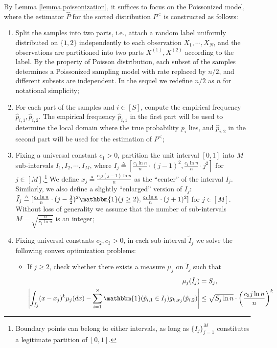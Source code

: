 \documentclass[final,12pt]{colt2018} %
\begin{document}
By Lemma \ref{lemma.poissonization}, it suffices to focus on the Poissonized model, where the estimator $\hat{P}$ for the sorted distribution $P^<$ is constructed as follows:
\begin{enumerate}
	\item Split the samples into two parts, i.e., attach a random label uniformly distributed on $\{1,2\}$ independently to each observation $X_1,\cdots,X_N$, and the observations are partitioned into two parts $X^{(1)}, X^{(2)}$ according to the label. By the property of Poisson distribution, each subset of the samples determines a Poissonized sampling model with rate replaced by $n/2$, and different subsets are independent. In the sequel we redefine $n/2$ as $n$ for notational simplicity;
	\item For each part of the samples and $i\in [S]$, conpute the empirical frequency $\hat{p}_{i,1}, \hat{p}_{i,2}$. The empirical frequency $\hat{p}_{i,1}$ in the first part will be used to determine the local domain where the true probability $p_i$ lies, and $\hat{p}_{i,2}$ in the second part will be used for the estimation of $P^<$;
	\item Fixing a universal constant $c_1>0$, partition the unit interval $[0,1]$ into $M$ sub-intervals $I_1,I_2,\cdots,I_M$, where
$
	I_j \triangleq [\frac{c_1\ln n}{n}\cdot (j-1)^2, \frac{c_1\ln n}{n}\cdot j^2]$ for $j\in [M]
$.\footnote{Boundary points can belong to either intervals, as long as $\{I_j\}_{j=1}^M$ constitutes a legitimate partition of $[0,1]$.}
	We define $x_j\triangleq \frac{c_1j(j-1)\ln n}{n}$ as the ``center'' of the interval $I_j$. Similarly, we also define a slightly ``enlarged'' version of $I_j$:
$
	\tilde{I}_j \triangleq [\frac{c_1\ln n}{n}\cdot (j-\frac{3}{2})^2\mathbbm{1}(j\ge 2), \frac{c_1\ln n}{n}\cdot (j+1)^2]$ for $ j\in [M].
$
	Without loss of generality we assume that the number of sub-intervals $M=\sqrt{\frac{n}{c_1\ln n}}$ is an integer;
	\item Fixing universal constants $c_2,c_3>0$, in each sub-interval $\tilde{I}_j$ we solve the following convex optimization problems:
	\begin{itemize}
		\item If $j\ge 2$, check whether there exists a measure $\mu_j$ on $\tilde{I}_j$ such that
		\begin{align}
		\mu_j(\tilde{I}_j) &= S_j, \label{eq.LP_1}\\
		\left|\int_{\tilde{I}_j} (x-x_j)^k\mu_j(dx) - \sum_{i=1}^S \mathbbm{1}(\hat{p}_{i,1}\in I_j)g_{k,x_j}(\hat{p}_{i,2})\right| &\le \sqrt{S_j\ln n}\cdot \left(\frac{c_3j\ln n}{n}\right)^{k} \label{eq.LP_2}

\end{align}
\end{itemize}
\end{enumerate}
\end{document}
